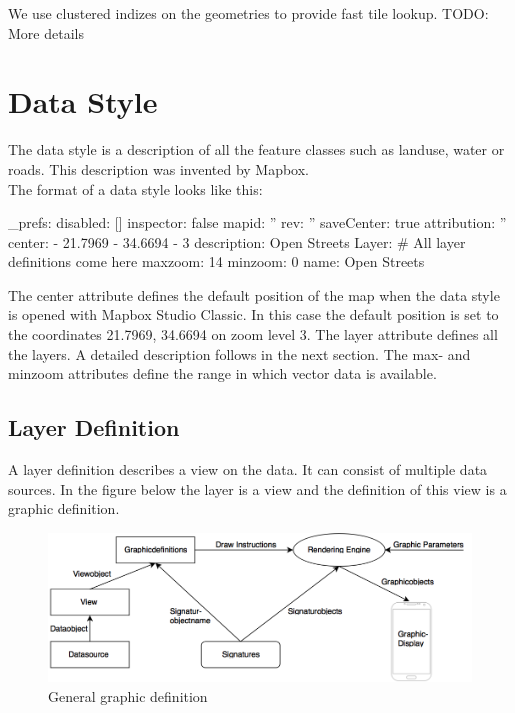 We use clustered indizes on the geometries to provide fast tile lookup.
TODO: More details

\section{Data Style}\label{data_style}

The data style is a description of all the feature classes such as landuse, water or roads. This description was invented by Mapbox.
\\
The format of a data style looks like this:
\begin{yamlcode}
_prefs: 
  disabled: []
  inspector: false
  mapid: ''
  rev: ''
  saveCenter: true
attribution: ''
center: 
  - 21.7969
  - 34.6694
  - 3
description: Open Streets
Layer: 
    # All layer definitions come here
maxzoom: 14
minzoom: 0
name: Open Streets
\end{yamlcode}
The center attribute defines the default position of the map when the data style is opened with Mapbox Studio Classic. In this case the default position is set to the coordinates 21.7969, 34.6694 on zoom level 3. The layer attribute defines all the layers. A detailed description follows in the next section. The max- and minzoom attributes define the range in which vector data is available.
\newpage
\subsection{Layer Definition}\label{layer_definition}
A layer definition describes a view on the data. It can consist of multiple data sources. In the figure below the layer is a view and the definition of this view is a graphic definition.

\begin{figure}[h]
  \centering
  \includegraphics[width=1\textwidth]{images/graphic_definition.png}
  \caption{General graphic definition}
\end{figure}

